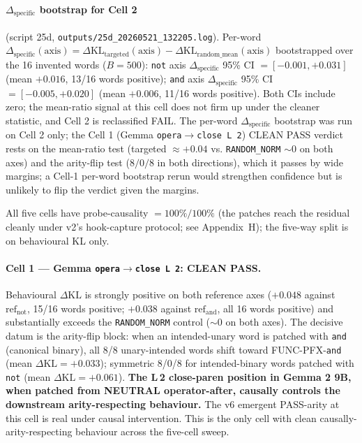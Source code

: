\documentclass[11pt,letterpaper]{article}
\newcommand{\dkl}{\ensuremath{\Delta\mathrm{KL}}}
\newcommand{\dspec}{\ensuremath{\Delta_{\text{specific}}}}
\begin{document}
\paragraph{\dspec{} bootstrap for Cell 2} (script 25d,
\texttt{outputs/25d\_20260521\_132205.log}). Per-word
$\dspec(\text{axis}) = \dkl_{\text{targeted}}(\text{axis}) -
\dkl_{\text{random\_mean}}(\text{axis})$ bootstrapped over the 16
invented words ($B = 500$): \texttt{not} axis \dspec{} 95\% CI
$= \mathbf{[-0.001, +0.031]}$ (mean $+0.016$, 13/16 words positive);
\texttt{and} axis \dspec{} 95\% CI $= \mathbf{[-0.005, +0.020]}$
(mean $+0.006$, 11/16 words positive). Both CIs include zero; the
mean-ratio signal at this cell does not firm up under the cleaner
statistic, and Cell 2 is reclassified FAIL. The per-word \dspec{}
bootstrap was run on Cell 2 only; the Cell 1 (Gemma
\texttt{opera$\to$close L\,2}) CLEAN PASS verdict rests on the
mean-ratio test (targeted $\approx +0.04$ vs. \texttt{RANDOM\_NORM}
${\sim}0$ on both axes) and the arity-flip test ($8/0/8$ in both
directions), which it passes by wide margins; a Cell-1 per-word
bootstrap rerun would strengthen confidence but is unlikely to flip
the verdict given the margins.

All five cells have probe-causality $= 100\% / 100\%$ (the patches
reach the residual cleanly under v2's hook-capture protocol; see
Appendix~H); the five-way split is on behavioural KL
only.

\paragraph{Cell 1 --- Gemma \texttt{opera$\to$close L\,2}: CLEAN
PASS.} Behavioural \dkl{} is strongly positive on both reference axes
($+0.048$ against $\text{ref}_{\text{not}}$, 15/16 words positive;
$+0.038$ against $\text{ref}_{\text{and}}$, all 16 words positive)
and substantially exceeds the \texttt{RANDOM\_NORM} control
(${\sim}0$ on both axes). The decisive datum is the arity-flip
block: when an intended-unary word is patched with \texttt{and}
(canonical binary), all 8/8 unary-intended words shift toward
FUNC-PFX-\texttt{and} (mean $\dkl = +0.033$); symmetric 8/0/8 for
intended-binary words patched with \texttt{not} (mean
$\dkl = +0.061$). \textbf{The L\,2 close-paren position in Gemma 2
9B, when patched from NEUTRAL operator-after, causally controls the
downstream arity-respecting behaviour.} The v6 emergent PASS-arity
at this cell is real under causal intervention. This is the only
cell with clean causally-arity-respecting behaviour across the
five-cell sweep.
\end{document}
